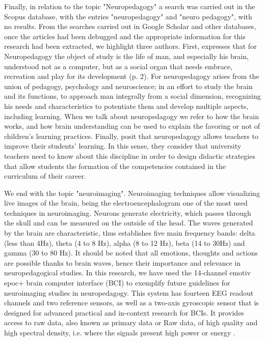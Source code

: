 \documentclass[english]{textolivre}
\begin{document}
Finally, in relation to the topic "Neuropedagogy" a search was carried out in the Scopus database, with the entries "neuropedagogy" and "neuro pedagogy", with no results. From the searches carried out in Google Scholar and other databases, once the articles had been debugged and the appropriate information for this research had been extracted, we highlight three authors. First, \textcite{jimenez_ludica_2010} expresses that for Neuropedagogy the object of study is the life of man, and especially his brain, understood not as a computer, but as a social organ that needs embrace, recreation and play for its development (p. 2). For \textcite{castillo_neurociencias_2015} neuropedagogy arises from the union of pedagogy, psychology and neuroscience; in an effort to study the brain and its functions, to approach man integrally from a social dimension, recognizing his needs and characteristics to potentiate them and develop multiple aspects, including learning. When we talk about neuropedagogy we refer to how the brain works, and how brain understanding can be used to explain the favoring or not of children's learning practices. Finally, \textcite{torres_rios_caracterizacion_2018} posit that neuropedagogy allows teachers to improve their students' learning. In this sense, they consider that university teachers need to know about this discipline in order to design didactic strategies that allow students the formation of the competencies contained in the curriculum of their career.

We end with the topic "neuroimaging". Neuroimaging techniques allow visualizing live images of the brain, being the electroencephalogram one of the most used techniques in neuroimaging. Neurons generate electricity, which passes through the skull and can be measured on the outside of the head. The waves generated by the brain are characteristic, thus \textcite{cardinali_neurociencia_2007} establishes five main frequency bands: delta (less than 4Hz), theta (4 to 8 Hz), alpha (8 to 12 Hz), beta (14 to 30Hz) and gamma (30 to 80 Hz). It should be noted that all emotions, thoughts and actions are possible thanks to brain waves, hence their importance and relevance in neuropedagogical studies. In this research, we have used the 14-channel emotiv epoc+ brain computer interface (BCI) to exemplify future guidelines for neuroimaging studies in neuropedagogy. This system has fourteen EEG readout channels and two reference sensors, as well as a two-axis gyroscopic sensor that is designed for advanced practical and in-context research for BCIs. It provides access to raw data, also known as primary data or Raw data, of high quality and high spectral density, i.e. where the signals present high power or energy \cite[p. 23]{cardenas_gomez_identificacion_2021}.
\end{document}
